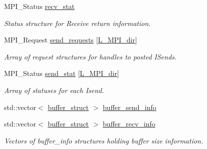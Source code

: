 \begin{DoxyCompactItemize}
M\+P\+I\+\_\+\+Status \hyperlink{class_mpi_manager_a257bc27e8099f1cbf5ac70b80d8eadaa}{recv\+\_\+stat}
\begin{DoxyCompactList}\small\item\em Status structure for Receive return information. \end{DoxyCompactList}\item 
M\+P\+I\+\_\+\+Request \hyperlink{class_mpi_manager_af096663b094d919caba62d4bdf8e7d88}{send\+\_\+requests} \mbox{[}\hyperlink{definitions_8h_a3310be18f0cfda9ca2a17c51518a97e9}{L\+\_\+\+M\+P\+I\+\_\+dir}\mbox{]}
\begin{DoxyCompactList}\small\item\em Array of request structures for handles to posted I\+Sends. \end{DoxyCompactList}\item 
M\+P\+I\+\_\+\+Status \hyperlink{class_mpi_manager_ab129fdffa1925677841f25bcd4507b5e}{send\+\_\+stat} \mbox{[}\hyperlink{definitions_8h_a3310be18f0cfda9ca2a17c51518a97e9}{L\+\_\+\+M\+P\+I\+\_\+dir}\mbox{]}
\begin{DoxyCompactList}\small\item\em Array of statuses for each Isend. \end{DoxyCompactList}\item 
std\+::vector$<$ \hyperlink{struct_mpi_manager_1_1buffer__struct}{buffer\+\_\+struct} $>$ \hyperlink{class_mpi_manager_a3a91c2e8cfb15027a0681c198f82d257}{buffer\+\_\+send\+\_\+info}
\item 
std\+::vector$<$ \hyperlink{struct_mpi_manager_1_1buffer__struct}{buffer\+\_\+struct} $>$ \hyperlink{class_mpi_manager_a5e769fa077d24d62d10a9a0d303009d1}{buffer\+\_\+recv\+\_\+info}
\begin{DoxyCompactList}\small\item\em Vectors of buffer\+\_\+info structures holding buffer size information. \end{DoxyCompactList}\end{DoxyCompactItemize}
